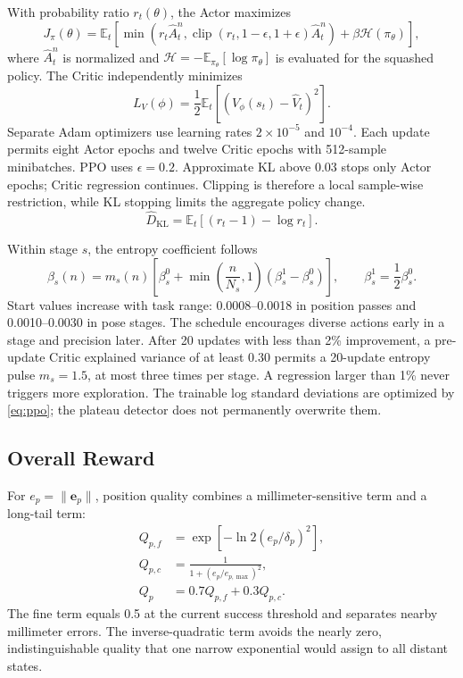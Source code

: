 \documentclass[conference]{IEEEtran}
\begin{document}
With probability ratio $r_t(\theta)$, the Actor maximizes
\begin{equation}
J_\pi(\theta)=\mathbb E_t\!\left[
\min\!\left(r_t\hat A_t^n,
\operatorname{clip}(r_t,1-\epsilon,1+\epsilon)\hat A_t^n\right)
+\beta\mathcal H(\pi_\theta)
\right],
\label{eq:ppo}
\end{equation}
where $\hat A_t^n$ is normalized and
$\mathcal H=-\mathbb E_{\pi_\theta}[\log\pi_\theta]$ is evaluated for the squashed policy. The Critic independently minimizes
\begin{equation}
L_V(\phi)=\frac{1}{2}\mathbb E_t
\left[(V_\phi(s_t)-\hat V_t)^2\right].
\label{eq:critic}
\end{equation}
Separate Adam optimizers use learning rates $2\times10^{-5}$ and $10^{-4}$. Each update permits eight Actor epochs and twelve Critic epochs with 512-sample minibatches. PPO uses $\epsilon=0.2$. Approximate KL above 0.03 stops only Actor epochs; Critic regression continues. Clipping is therefore a local sample-wise restriction, while KL stopping limits the aggregate policy change.
\begin{equation}
\widehat D_{\mathrm{KL}}
=\mathbb E_t\!\left[(r_t-1)-\log r_t\right].
\label{eq:approx_kl}
\end{equation}

Within stage $s$, the entropy coefficient follows
\begin{equation}
\beta_s(n)=m_s(n)\!\left[
\beta_s^{0}+
\min\!\left(\frac{n}{N_s},1\right)
(\beta_s^{1}-\beta_s^{0})
\right],
\qquad \beta_s^{1}=\frac{1}{2}\beta_s^{0}.
\label{eq:entropy}
\end{equation}
Start values increase with task range: 0.0008--0.0018 in position passes and 0.0010--0.0030 in pose stages. The schedule encourages diverse actions early in a stage and precision later. After 20 updates with less than 2\% improvement, a pre-update Critic explained variance of at least 0.30 permits a 20-update entropy pulse $m_s=1.5$, at most three times per stage. A regression larger than 1\% never triggers more exploration. The trainable log standard deviations are optimized by \eqref{eq:ppo}; the plateau detector does not permanently overwrite them.

\subsection{Overall Reward}

For $e_p=\|\mathbf e_p\|$, position quality combines a millimeter-sensitive term and a long-tail term:
\begin{align}
Q_{p,f}&=\exp\!\left[-\ln2(e_p/\delta_p)^2\right],\nonumber\\
Q_{p,c}&=\frac{1}{1+(e_p/e_{p,\max})^2},\nonumber\\
Q_p&=0.7Q_{p,f}+0.3Q_{p,c}.
\label{eq:position_quality}
\end{align}
The fine term equals 0.5 at the current success threshold and separates nearby millimeter errors. The inverse-quadratic term avoids the nearly zero, indistinguishable quality that one narrow exponential would assign to all distant states.
\end{document}
